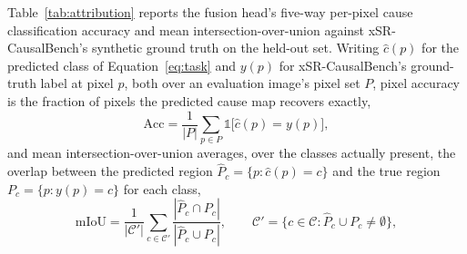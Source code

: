 \documentclass[review]{elsarticle}
\begin{document}
Table~\ref{tab:attribution} reports the fusion head's five-way per-pixel cause classification accuracy and mean intersection-over-union against xSR-CausalBench's synthetic ground truth on the held-out set. Writing $\hat{c}(p)$ for the predicted class of Equation~\ref{eq:task} and $y(p)$ for xSR-CausalBench's ground-truth label at pixel $p$, both over an evaluation image's pixel set $P$, pixel accuracy is the fraction of pixels the predicted cause map recovers exactly,
\begin{equation}
\mathrm{Acc} = \frac{1}{|P|}\sum_{p \in P} \mathbb{1}\big[\hat{c}(p) = y(p)\big],
\label{eq:pixel-acc}
\end{equation}
and mean intersection-over-union averages, over the classes actually present, the overlap between the predicted region $\hat{P}_c = \{p : \hat{c}(p)=c\}$ and the true region $P_c = \{p : y(p) = c\}$ for each class,
\begin{equation}
\mathrm{mIoU} = \frac{1}{|\mathcal{C}'|}\sum_{c \in \mathcal{C}'} \frac{|\hat{P}_c \cap P_c|}{|\hat{P}_c \cup P_c|}, \qquad \mathcal{C}' = \{c \in \mathcal{C} : \hat{P}_c \cup P_c \neq \emptyset\},
\label{eq:miou}
\end{equation}
\end{document}
